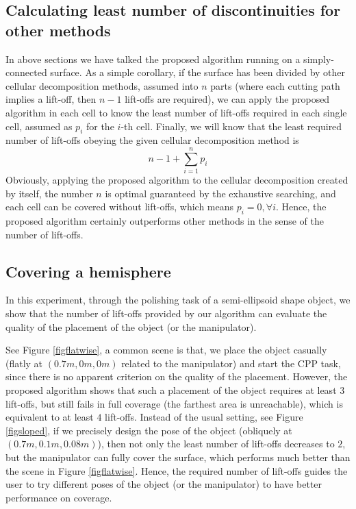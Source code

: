 \documentclass[journal]{IEEEtran}
\begin{document}
\subsection{Calculating least number of discontinuities for other methods}
In above sections we have talked the proposed algorithm running on a simply-connected surface. As a simple corollary, if the surface has been divided by other cellular decomposition methods, assumed into $n$ parts (where each cutting path implies a lift-off, then $n-1$ lift-offs are required), we can apply the proposed algorithm in each cell to know the least number of lift-offs required in each single cell, assumed as $p_i$ for the $i$-th cell. Finally, we will know that the least required number of lift-offs obeying the given cellular decomposition method is 
$$n-1 + \sum\limits_{i = 1}^n p_i$$ 
Obviously, applying the proposed algorithm to the cellular decomposition created by itself, the number $n$ is optimal guaranteed by the exhaustive searching, and each cell can be covered without lift-offs, which means $p_i = 0, \forall i$. Hence, the proposed algorithm certainly outperforms other methods in the sense of the number of lift-offs. 



\subsection{Covering a hemisphere}
In this experiment, through the polishing task of a semi-ellipsoid shape object, we show that the number of lift-offs provided by our algorithm can evaluate the quality of the placement of the object (or the manipulator). 

See Figure \ref{figflatwise}, a common scene is that, we place the object casually (flatly at $(0.7m, 0m, 0m)$ related to the manipulator) and start the CPP task, since there is no apparent criterion on the quality of the placement. However, the proposed algorithm shows that such a placement of the object requires at least $3$ lift-offs, but still fails in full coverage (the farthest area is unreachable), which is equivalent to at least $4$ lift-offs. 
Instead of the usual setting, see Figure \ref{figsloped}, if we precisely design the pose of the object (obliquely at $(0.7m, 0.1m, 0.08m)$), then not only the least number of lift-offs decreases to $2$, but the manipulator can fully cover the surface, which performs much better than the scene in Figure \ref{figflatwise}. Hence, the required number of lift-offs guides the user to try different poses of the object (or the manipulator) to have better performance on coverage. 
\end{document}
